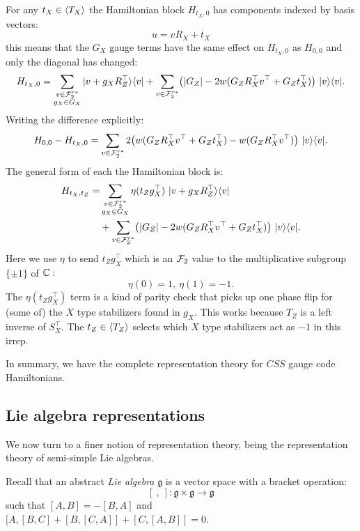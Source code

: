 For any $t_X\in \langle T_X \rangle$ the Hamiltonian block $H_{t_X,0}$
has components indexed by basis vectors:
$$
    u = v R_X + t_X
$$
this means that the $G_X$ gauge terms
have the same effect on $H_{t_X,0}$
as $H_{0,0}$ and only the diagonal has changed:
$$
H_{t_X,0} = \sum_{\substack{v\in\mathcal{F}_2^{r*}\\g_X\in G_X } }
  |{v+g_X  R_Z^\top}\rangle\langle{v}| 
  + \sum_{v\in\mathcal{F}_2^{r*}} \bigl(
    |G_Z| - 2w(G_Z R_X^\top v^\top + G_Z t_X^\top)
    \bigr) \ |{v}\rangle\langle{v}|.
$$
Writing the difference explicitly:
$$
    H_{0,0} - H_{t_X,0} = 
  \sum_{v\in\mathcal{F}_2^{r*}} 2\bigl(
    w(G_Z R_X^\top v^\top + G_Z t_X^\top)
    -w(G_Z R_X^\top v^\top)
    \bigr) \ |{v}\rangle\langle{v}|.
$$
The general form of
each the Hamiltonian block is:
\begin{align*}
H_{t_X,t_Z} = &\sum_{\substack{v\in\mathcal{F}_2^{r*}\\g_X\in G_X } }
    \eta(t_Z g_X^\top)
  \ |{v+g_X  R_Z^\top}\rangle\langle{v}| \\
  &+ \sum_{v\in\mathcal{F}_2^{r*}} \bigl(
    |G_Z| - 2w(G_Z R_X^\top v^\top + G_Z t_X^\top)
    \bigr) \ |{v}\rangle\langle{v}|.
\end{align*}
Here we use $\eta$ to send 
$t_Zg_X^\top$ which is an $\mathcal{F}_2$ value
to the multiplicative subgroup $\{\pm1\}$
of $\mathbb{C}:$
$$
    \eta(0) = 1,\ \eta(1) = -1.
$$
The $\eta(t_Zg_X^\top)$ term
is a kind of parity check that
picks up one phase flip for (some of)
the $X$ type stabilizers found in $g_X.$
This works because $T_Z$ is a left inverse
of $S_X^\top.$
The $t_Z\in\langle T_Z \rangle$ selects which
$X$ type stabilizers act as $-1$ in this irrep.

In summary, we have the complete representation
theory for $CSS$ gauge code Hamiltonians.

%

\subsection{Lie algebra representations}


\def\lie{\mathfrak{g}}
\def\lieh{\mathfrak{h}}
\def\sl{\mathfrak{sl}}

We now turn to a finer notion of representation theory,
being the representation theory of semi-simple Lie algebras.

Recall \cite{Fulton2013} that an abstract 
\emph{Lie algebra} $\lie$ is 
a vector space with a bracket operation:
$$
    [\ ,\  ] : \lie \times \lie \to \lie
$$
such that $[A,B] = -[B,A]$ and
$[A,[B,C]+[B,[C,A]]+[C,[A,B]]=0.$

